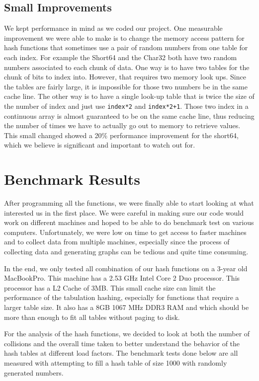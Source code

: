 \documentclass[11pt]{article}
\begin{document}
\subsection{Small Improvements}
We kept performance in mind as we coded our project. One measurable improvement
we were able to make is to change the memory access pattern for hash functions that 
sometimes use a pair of random numbers from one table for each index. For example
the Short64 and the Char32 both have two random numbers associated to each chunk of data.
One way is to have two tables for the chunk of bits to index into. However, that requires two 
memory look ups. Since the tables are fairly large, it is impossible for those two numbers 
be in the same cache line. The other way is to have a single look-up table that is twice the size
of the number of index and just use \texttt{index*2} and \texttt{index*2+1}. 
Those two index in a continuous array is almost guaranteed to be on the 
same cache line, thus reducing the number of times we have to actually 
go out to memory to retrieve values. This small changed showed a 20\% performance improvement 
for the short64, which we believe is significant and important to watch out for.


\section{Benchmark Results}
After programming all the functions, we were finally able to start looking at 
what interested us in the first place. We were careful in making sure our code 
would work on different machines and hoped to be able to do benchmark test 
on various computers. Unfortunately, we were low on time to get access to 
faster machines and to
collect data from multiple machines, especially since the process of collecting data
and generating graphs can be tedious and quite time consuming. 

In the end, we only tested all combination of our hash functions on a 3-year old MacBookPro.
This machine has a  2.53 GHz Intel Core 2 Duo processor. This processor has a L2 Cache of 3MB.
This small cache size can limit the performance of the tabulation hashing, especially for functions
that require a larger table size.
It also has a 8GB 1067 MHz DDR3 RAM and which should be more than enough to fit all tables
without paging to disk.

For the analysis of the hash functions, we decided to look at both the number of collisions
 and the overall time taken to better understand the behavior of the hash tables at 
 different load factors. The benchmark tests done below are all measured with 
 attempting to fill a hash table of size 1000 with randomly generated numbers.
\end{document}
